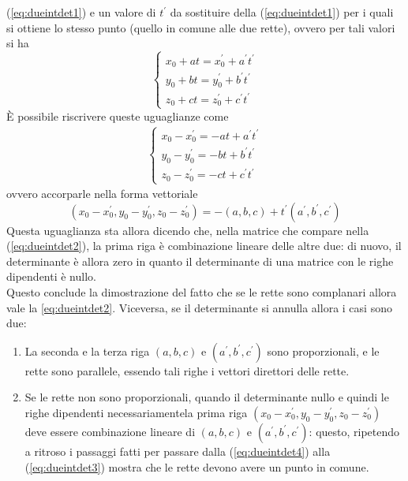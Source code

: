 (\ref{eq:dueintdet1}) e un valore di $t^\prime$ da sostituire della
(\ref{eq:dueintdet1}) per i quali si ottiene lo stesso punto (quello in
comune alle due rette), ovvero per tali valori si ha
\begin{equation}
  \label{eq:dueintdet3}
  \begin{cases}
    x_0 +at=x_0^\prime+a^\prime t^\prime\\
    y_0 + bt = y_0^\prime + b^\prime t^\prime\\
    z_0+ct=z_0^\prime+c^\prime t^\prime
  \end{cases}
\end{equation}
È possibile riscrivere queste uguaglianze come
\begin{eqnarray*}
  \begin{cases}
    x_0-x_0^\prime=-at+a^\prime t^\prime\\
    y_0-y_0^\prime=-bt+b^\prime t^\prime\\
    z_0-z_0^\prime=-ct+c^\prime t^\prime
  \end{cases}
\end{eqnarray*}
ovvero accorparle nella forma vettoriale
\begin{equation}
  \label{eq:dueintdet4}
  (x_0-x_0^\prime,y_0-y_0^\prime,z_0-z_0^\prime)=-(a,b,c)+t^\prime(a^\prime,
  b^\prime,c^\prime) 
\end{equation}
Questa uguaglianza sta allora dicendo che, nella matrice che compare nella
(\ref{eq:dueintdet2}), la prima riga è combinazione lineare delle altre
due: di nuovo, il determinante è allora zero in quanto il determinante di
una matrice con le righe dipendenti è nullo.\\
Questo conclude la dimostrazione del fatto che se le rette sono complanari
allora vale la \ref{eq:dueintdet2}. Viceversa, se il determinante si
annulla allora i casi sono due:
\begin{enumerate}
\item La seconda e la terza riga $(a,b,c)$ e $(a^\prime,b^\prime,c^\prime)$
  sono proporzionali, e le rette sono parallele, essendo tali righe i
  vettori direttori delle rette.
\item Se le rette non sono proporzionali, quando il determinante nullo e
  quindi le righe dipendenti necessariamentela prima riga
  $(x_0-x_0^\prime, y_0-y_0^\prime, z_0-z_0^\prime)$ deve essere
  combinazione lineare di $(a,b,c)$ e $(a^\prime,b^\prime,c^\prime)$:
  questo, ripetendo a ritroso i passaggi fatti per passare dalla
  (\ref{eq:dueintdet4}) alla (\ref{eq:dueintdet3}) mostra che le rette
  devono avere un punto in comune.
\end{enumerate}
  
